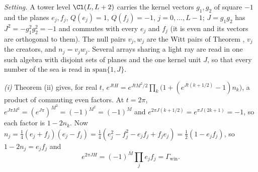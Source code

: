 \emph{Setting.} A tower level $\Cl(L, L + 2)$ carries the kernel vectors $g_{1}, g_{2}$ of square $-1$ and the planes $e_{j}, f_{j}$, $Q(e_{j}) = 1$, $Q(f_{j}) = -1$, $j = 0, \dots, L - 1$; $J = g_{1}g_{2}$ has $J^{2} = -g_{1}^{2}g_{2}^{2} = -1$ and commutes with every $e_{j}$ and $f_{j}$ (it is even and its vectors are orthogonal to them). The null pairs $v_{j}, w_{j}$ are the Witt pairs of Theorem , $v_{j}$ the creators, and $n_{j} = v_{j}w_{j}$. Several arrays sharing a light ray are read in one such algebra with disjoint sets of planes and the one kernel unit $J$, so that every number of the sea is read in $\mathrm{span}\{1, J\}$.

\emph{(i)} Theorem (ii) gives, for real $t$, $e^{JtH} = e^{JtM^{2}/2}\prod_{k}\bigl(1 + (e^{Jt(k + 1/2)} - 1)n_{k}\bigr)$, a product of commuting even factors. At $t = 2\pi$, $e^{J\pi M^{2}} = (e^{J\pi})^{M^{2}} = (-1)^{M^{2}} = (-1)^{M}$ and $e^{2\pi J(k + 1/2)} = e^{\pi J(2k + 1)} = -1$, so each factor is $1 - 2n_{k}$. Now $n_{j} = \tfrac14(e_{j} + f_{j})(e_{j} - f_{j}) = \tfrac14(e_{j}^{2} - f_{j}^{2} - e_{j}f_{j} + f_{j}e_{j}) = \tfrac12(1 - e_{j}f_{j})$, so $1 - 2n_{j} = e_{j}f_{j}$ and
\[
e^{2\pi JH} = (-1)^{M}\prod_{j}e_{j}f_{j} = \Gamma_{\mathrm{win}} .
\]
